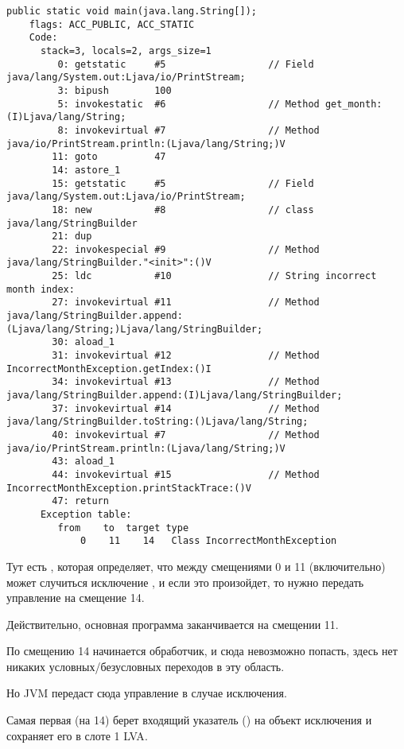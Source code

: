 \begin{lstlisting}[caption=Month2.class]
  public static void main(java.lang.String[]);
    flags: ACC_PUBLIC, ACC_STATIC
    Code:
      stack=3, locals=2, args_size=1
         0: getstatic     #5                  // Field java/lang/System.out:Ljava/io/PrintStream;
         3: bipush        100
         5: invokestatic  #6                  // Method get_month:(I)Ljava/lang/String;
         8: invokevirtual #7                  // Method java/io/PrintStream.println:(Ljava/lang/String;)V
        11: goto          47
        14: astore_1      
        15: getstatic     #5                  // Field java/lang/System.out:Ljava/io/PrintStream;
        18: new           #8                  // class java/lang/StringBuilder
        21: dup           
        22: invokespecial #9                  // Method java/lang/StringBuilder."<init>":()V
        25: ldc           #10                 // String incorrect month index: 
        27: invokevirtual #11                 // Method java/lang/StringBuilder.append:(Ljava/lang/String;)Ljava/lang/StringBuilder;
        30: aload_1       
        31: invokevirtual #12                 // Method IncorrectMonthException.getIndex:()I
        34: invokevirtual #13                 // Method java/lang/StringBuilder.append:(I)Ljava/lang/StringBuilder;
        37: invokevirtual #14                 // Method java/lang/StringBuilder.toString:()Ljava/lang/String;
        40: invokevirtual #7                  // Method java/io/PrintStream.println:(Ljava/lang/String;)V
        43: aload_1       
        44: invokevirtual #15                 // Method IncorrectMonthException.printStackTrace:()V
        47: return        
      Exception table:
         from    to  target type
             0    11    14   Class IncorrectMonthException
\end{lstlisting}

Тут есть , которая определяет, что между смещениями 0 и 11 (включительно)
может случиться исключение , и если это произойдет, то нужно передать
управление на смещение 14.

Действительно, основная программа заканчивается на смещении 11.

По смещению 14 начинается обработчик, и сюда невозможно попасть, 
здесь нет никаких условных/безусловных переходов в эту область.

Но \ac{JVM} передаст сюда управление в случае исключения.

Самая первая  (на 14) берет входящий указатель () на объект 
исключения и сохраняет его в слоте 1 \ac{LVA}.

